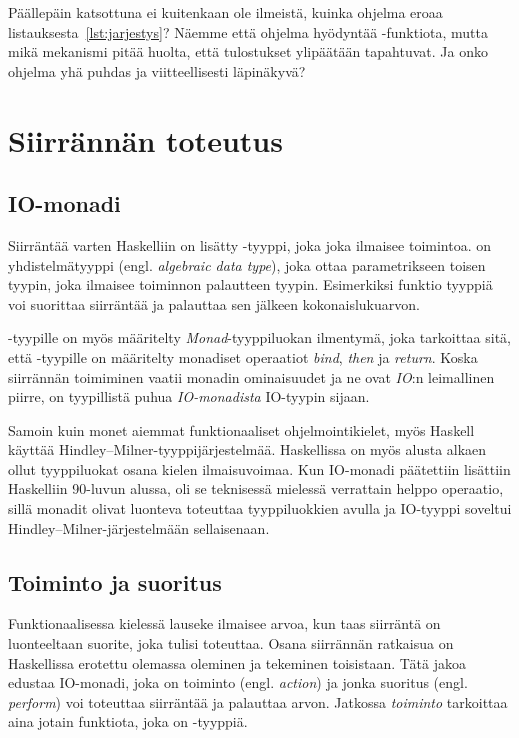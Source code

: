\documentclass[finnish]{tktltiki2}
\begin{document}
Päällepäin katsottuna ei kuitenkaan ole ilmeistä, kuinka ohjelma eroaa
listauksesta~\ref{lst:jarjestys}? Näemme että ohjelma hyödyntää -funktiota, mutta mikä
mekanismi pitää huolta, että tulostukset ylipäätään tapahtuvat. Ja onko ohjelma yhä puhdas ja
viitteellisesti läpinäkyvä?


\section{Siirrännän toteutus}

\subsection{IO-monadi}

Siirräntää varten Haskelliin on lisätty -tyyppi, joka joka ilmaisee toimintoa.  on
yhdistelmätyyppi (engl. \emph{algebraic data type}), joka ottaa parametrikseen toisen tyypin, joka
ilmaisee toiminnon palautteen tyypin. Esimerkiksi funktio tyyppiä  voi suorittaa
siirräntää ja palauttaa sen jälkeen kokonaislukuarvon.

-tyypille on myös määritelty \emph{Monad}-tyyppiluokan ilmentymä, joka tarkoittaa sitä,
että -tyypille on määritelty monadiset operaatiot \emph{bind}, \emph{then} ja
\emph{return}. Koska siirrännän toimiminen vaatii monadin ominaisuudet ja ne ovat \emph{IO}:n
leimallinen piirre, on tyypillistä puhua \emph{IO-monadista} IO-tyypin sijaan.

Samoin kuin monet aiemmat funktionaaliset ohjelmointikielet, myös Haskell käyttää
Hindley--Milner-tyyppijärjestelmää. Haskellissa on myös alusta alkaen ollut tyyppiluokat osana
kielen ilmaisuvoimaa. Kun IO-monadi päätettiin lisättiin Haskelliin 90-luvun alussa, oli se
teknisessä mielessä verrattain helppo operaatio, sillä monadit olivat luonteva toteuttaa
tyyppiluokkien avulla ja IO-tyyppi soveltui Hindley--Milner-järjestelmään sellaisenaan.

\subsection{Toiminto ja suoritus}


Funktionaalisessa kielessä lauseke ilmaisee arvoa, kun taas siirräntä on luonteeltaan suorite, joka
tulisi toteuttaa. Osana siirrännän ratkaisua on Haskellissa erotettu olemassa oleminen ja tekeminen
toisistaan. Tätä jakoa edustaa IO-monadi, joka on toiminto (engl. \emph{action}) ja jonka suoritus
(engl. \emph{perform}) voi toteuttaa siirräntää ja palauttaa arvon. Jatkossa \emph{toiminto}
tarkoittaa aina jotain funktiota, joka on -tyyppiä.
\end{document}
